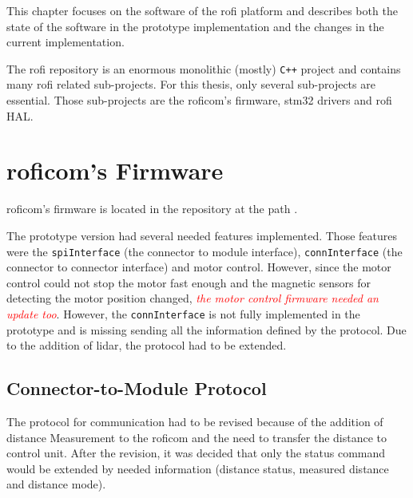 \documentclass[
  digital,     %
  oneside,     %
  nosansbold,  %
  nocolorbold, %
  nolof,         %
  nolot,         %
]{fithesis4}
\newcommand{\TODO}[1]{\textcolor{red}{\textit{#1}}}
\begin{document}
{{{This chapter focuses on the software of the \acrshort{rofi} platform and describes both the state of the software in the prototype implementation and the changes in the current implementation.

The \acrshort{rofi} repository is an enormous monolithic (mostly) \verb|C++| project and contains many \acrshort{rofi} related sub-projects. For this thesis, only several sub-projects are essential. Those sub-projects are the \acrshort{roficom}'s firmware, stm32 drivers and \acrshort{rofi} HAL.


\section[ RoFICoM's Firmware ]{ \acrshort{roficom}'s Firmware } \label{sec:roficom-firmware}
\acrshort{roficom}'s firmware is located in the repository at the path .

The prototype version had several needed features implemented. Those features were the \lstinline|spiInterface| (the connector to module interface), \lstinline|connInterface| (the connector to connector interface) and motor control. However, since the motor control could not stop the motor fast enough and the magnetic sensors for detecting the motor position changed, \TODO{the motor control firmware needed an update too}. However, the \lstinline|connInterface| is not fully implemented in the prototype and is missing sending all the information defined by the protocol. Due to the addition of lidar, the protocol had to be extended.

\subsection{ Connector-to-Module Protocol }

The protocol for communication had to be revised because of the addition of distance Measurement to the \acrshort{roficom} and the need to transfer the distance to control unit. After the revision, it was decided that only the status command would be extended by needed information (distance status, measured distance and distance mode).

}}}
\end{document}
